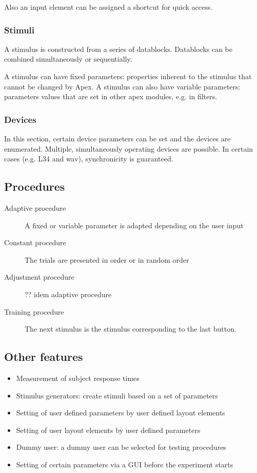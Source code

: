 \documentclass[a4paper,12pt]{article}
\begin{document}
Also an input element can be assigned a shortcut for quick access.

\subsubsection{Stimuli}

A stimulus is constructed from a series of datablocks. Datablocks can be combined simultaneously or sequentially. 

A stimulus can have fixed parameters: properties inherent to the stimulus that cannot be changed by Apex. A stimulus can also have variable parameters: parameters values that are set in other apex modules, e.g. in filters. 

\subsubsection{Devices}

In this section, certain device parameters can be set and the devices are enumerated. Multiple, simultaneously operating devices are possible. In certain cases (e.g. L34 and wav), synchronicity is guaranteed. 


\subsection{Procedures}

\label{procedures}

\begin{description}
\item[Adaptive procedure] A fixed or variable parameter is adapted depending on the user input
\item[Constant procedure] The trials are presented in order or in random order
\item[Adjustment procedure] ?? idem adaptive procedure
\item[Training procedure] The next stimulus is the stimulus corresponding to the last button. 
\end{description}

\subsection{Other features}

\begin{itemize}
\item Measurement of subject response times
\item Stimulus generators: create stimuli based on a set of parameters
\item Setting of user defined parameters by user defined layout elements
\item Setting of user layout elements by user defined parameters
\item Dummy user: a dummy user can be selected for testing procedures
\item Setting of certain parameters via a GUI before the experiment starts
\end{itemize}
\end{document}
